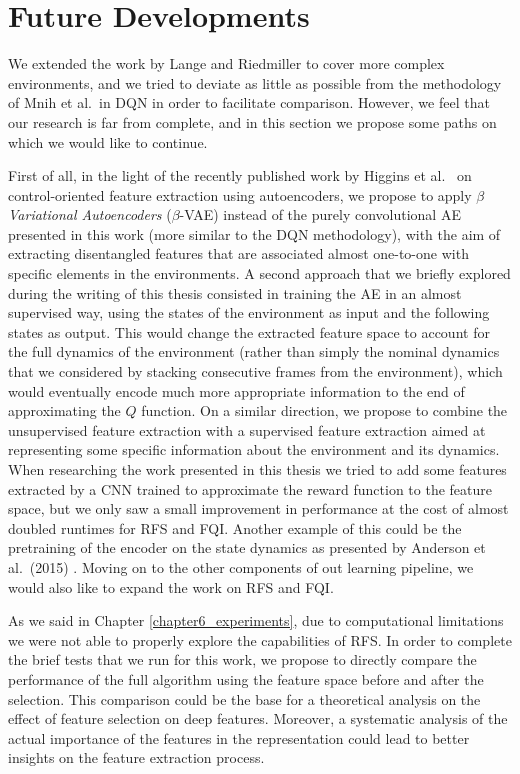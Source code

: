 \section{Future Developments}
We extended the work by Lange and Riedmiller \cite{lange2010deep} to cover 
more complex environments, and we tried to deviate as little as possible from 
the methodology of Mnih et al.\ in DQN \cite{mnih2015human} in order to 
facilitate comparison. However, we feel that our research is far from complete, 
and in this section we propose some paths on which we would like to continue. 

First of all, in the light of the recently published work by Higgins et al.\ \cite{higgins2017darla}
on control-oriented feature extraction using autoencoders, we propose to apply
\textit{$\beta$ Variational Autoencoders} ($\beta$-VAE) \cite{kingma2014auto, higgins2017beta} 
instead of the purely convolutional AE presented in this work (more similar to 
the DQN methodology), with the aim of extracting disentangled features that
are associated almost one-to-one with specific elements in the environments.
A second approach that we briefly explored during the writing of this thesis 
consisted in training the AE in an almost supervised way, using the states of 
the environment as input and the following states as output. 
This would change the extracted feature space to account for the full dynamics 
of the environment (rather than simply the nominal dynamics that we considered 
by stacking consecutive frames from the environment), which would eventually 
encode much more appropriate information to the end of approximating the $Q$ 
function. 
On a similar direction, we propose to combine the unsupervised feature 
extraction with a supervised feature extraction aimed at representing some 
specific information about the environment and its dynamics. 
When researching the work presented in this thesis we tried to add some features 
extracted by a CNN trained to approximate the reward function to the feature 
space, but we only saw a small improvement in performance at the cost of almost 
doubled runtimes for RFS and FQI. 
Another example of this could be the pretraining of the encoder on the state 
dynamics as presented by Anderson et al.\ (2015) \cite{anderson2015faster}.
Moving on to the other components of out learning pipeline, we would also like 
to expand the work on RFS and FQI. 

As we said in Chapter \ref{chapter6_experiments}, due to computational 
limitations we were not able to properly explore the capabilities of RFS.
In order to complete the brief tests that we run for this work, we propose to
directly compare the performance of the full algorithm using the feature space
before and after the selection. 
This comparison could be the base for a theoretical analysis on the
effect of feature selection on deep features. Moreover, a systematic analysis
of the actual importance of the features in the representation could lead
to better insights on the feature extraction process. 

